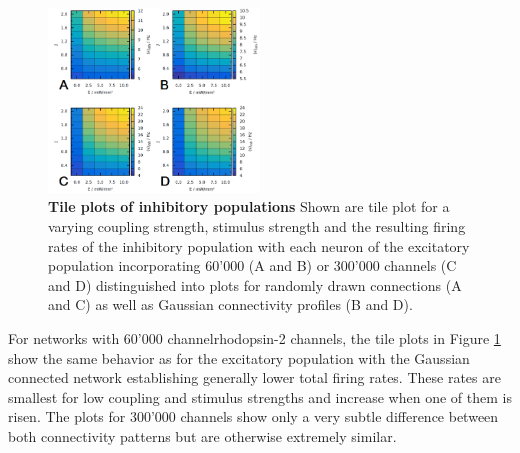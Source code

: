 \documentclass[14pt]{SelfArx} %
\numberwithin{equation}{section}
\begin{document}
\begin{figure} [htp]
\centering
\includegraphics[width = 0.5\textwidth]{in_tileplot.png}
\caption{\textbf{Tile plots of inhibitory populations} Shown are tile plot for a varying coupling strength, stimulus strength and the resulting firing rates of the inhibitory population with each neuron of the excitatory population incorporating 60'000 (A and B) or 300'000 channels (C and D) distinguished into plots for randomly drawn connections (A and C) as well as Gaussian connectivity profiles (B and D).}
\label{fig:tileplotin}
\end{figure}
\newline
For networks with 60'000 channelrhodopsin-2 channels, the tile plots in Figure \ref{fig:tileplotin} show the same behavior as for the excitatory population with the Gaussian connected network establishing generally lower total firing rates. These rates are smallest for low coupling and stimulus strengths and increase when one of them is risen.\newline
The plots for 300'000 channels show only a very subtle difference between both connectivity patterns but are otherwise extremely similar.
\label{sec:resultgeneral}
\newpage
\end{document}
